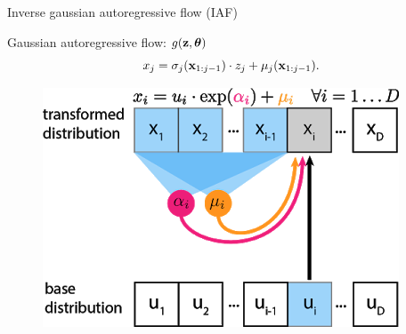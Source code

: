\documentclass{beamer}
\begin{document}
\begin{frame}{Inverse gaussian autoregressive flow (IAF)}
	
	\begin{minipage}[t]{0.65\columnwidth}
		\begin{block}{Gaussian autoregressive flow: $g(\mathbf{z}, \boldsymbol{\theta})$}
			\[
			x_j = \sigma_j (\mathbf{x}_{1:j-1}) \cdot z_j + \mu_j(\mathbf{x}_{1:j-1}).
			\]
		\end{block}
	\end{minipage}%
	\begin{minipage}[t]{0.35\columnwidth}
		\begin{figure}[h]
			\centering
			\includegraphics[width=.9\linewidth]{figs/af_iaf_explained_1.png}
		\end{figure}
	\end{minipage} \\
	

\end{frame}
\end{document}
